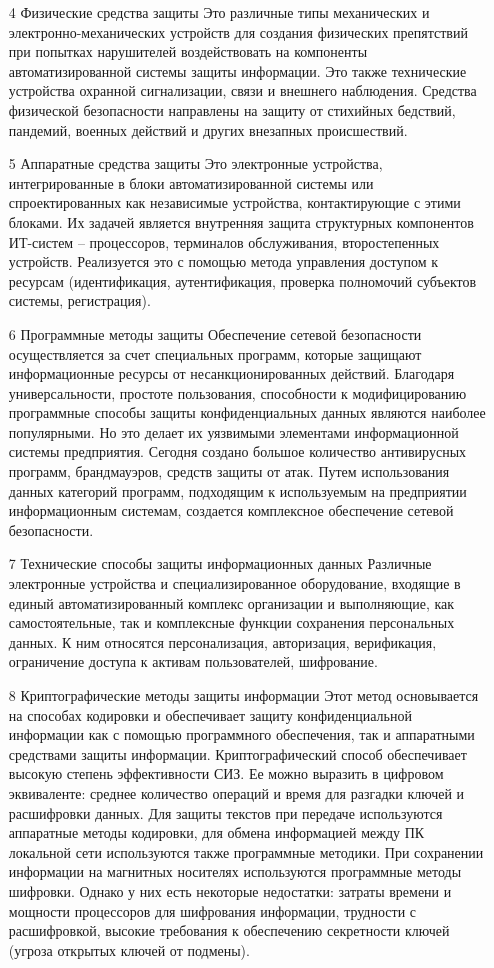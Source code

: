 \begin{enumerate}
    \item[4] Физические средства защиты 
Это различные типы механических и электронно-механических устройств для создания физических препятствий при попытках нарушителей воздействовать на компоненты автоматизированной системы защиты информации. Это также технические устройства охранной сигнализации, связи и внешнего наблюдения. Средства физической безопасности направлены на защиту от стихийных бедствий, пандемий, военных действий и других внезапных происшествий.
    \item[5]Аппаратные средства защиты
Это электронные устройства, интегрированные в блоки автоматизированной системы или спроектированных как независимые устройства, контактирующие с этими блоками. Их задачей является внутренняя защита структурных компонентов ИТ-систем – процессоров, терминалов обслуживания, второстепенных устройств. Реализуется это с помощью метода управления доступом к ресурсам (идентификация, аутентификация, проверка полномочий субъектов системы, регистрация). 
    \item[6]Программные методы защиты 
Обеспечение сетевой безопасности осуществляется за счет специальных программ, которые защищают информационные ресурсы от несанкционированных действий. Благодаря универсальности, простоте пользования, способности к модифицированию программные способы защиты конфиденциальных данных являются наиболее популярными. Но это делает их уязвимыми элементами информационной системы предприятия. Сегодня создано большое количество антивирусных программ, брандмауэров, средств защиты от атак. Путем использования данных категорий программ, подходящим к используемым на предприятии информационным системам, создается комплексное обеспечение сетевой безопасности.
    \item[7]Технические способы защиты информационных данных 
Различные электронные устройства и специализированное оборудование, входящие в единый автоматизированный комплекс организации и выполняющие, как самостоятельные, так и комплексные функции сохранения персональных данных. К ним относятся персонализация, авторизация, верификация, ограничение доступа к активам пользователей, шифрование.
    \item[8]Криптографические методы защиты информации 
Этот метод основывается на способах кодировки и обеспечивает защиту конфиденциальной информации как с помощью программного обеспечения, так и аппаратными средствами защиты информации. Криптографический способ обеспечивает высокую степень эффективности СИЗ. Ее можно выразить в цифровом эквиваленте: среднее количество операций и время для разгадки ключей и расшифровки данных.  Для защиты текстов при передаче используются аппаратные методы кодировки, для обмена информацией между ПК локальной сети используются также программные методики. При сохранении информации на магнитных носителях используются программные методы шифровки. Однако у них есть некоторые недостатки: затраты времени и мощности процессоров для шифрования информации, трудности с расшифровкой, высокие требования к обеспечению секретности ключей (угроза открытых ключей от подмены).

\end{enumerate}
